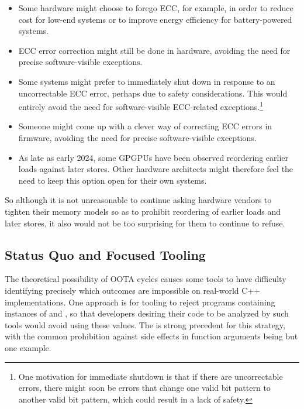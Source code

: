 \documentclass[10]{article}
\begin{document}
\begin{itemize}
\item	Some hardware might choose to forego ECC, for example, in order to
	reduce cost for low-end systems or to improve energy efficiency
	for battery-powered systems.
\item	ECC error correction might still be done in hardware, avoiding
	the need for precise software-visible exceptions.
\item	Some systems might prefer to immediately shut down in response to
	an uncorrectable ECC error, perhaps due to safety considerations.
	This would entirely avoid the need for software-visible
	ECC-related exceptions.\footnote{
		One motivation for immediate shutdown is that if there
		are uncorrectable errors, there might soon be errors
		that change one valid bit pattern to another valid
		bit pattern, which could result in a lack of safety.}
\item	Someone might come up with a clever way of correcting ECC errors
	in firmware, avoiding the need for precise software-visible
	exceptions.
\item	As late as early 2024, some GPGPUs have been observed reordering
	earlier loads against later stores.
	Other hardware architects might therefore feel the need to keep
	this option open for their own systems.
\end{itemize}

So although it is not unreasonable to continue asking hardware vendors
to tighten their memory models so as to prohibit reordering of earlier
loads and later stores, it also would not be too surprising for them to
continue to refuse.

\subsection{Status Quo and Focused Tooling}
\label{sec:Status Quo and Focused Tooling}

The theoretical possibility of OOTA cycles causes some tools to have
difficulty identifying precisely which outcomes are impossible on
real-world C++ implementations.
One approach is for tooling to reject programs containing instances
of  and , so that
developers desiring their code to be analyzed by such tools would
avoid using these  values.
The is strong precedent for this strategy, with the common prohibition
against side effects in function arguments being but one example.
\end{document}
